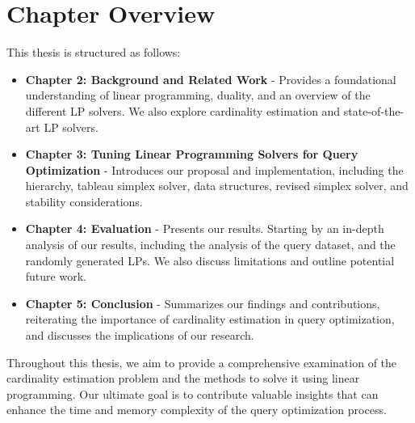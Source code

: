 \section{Chapter Overview}

This thesis is structured as follows:

\begin{itemize}
  \item \textbf{Chapter 2: Background and Related Work} - Provides a 
  foundational understanding of linear programming, duality, 
  and an overview of the different LP solvers. We also explore cardinality
   estimation and state-of-the-art LP solvers.
  \item \textbf{Chapter 3: Tuning Linear Programming Solvers for Query
   Optimization} - Introduces our proposal and implementation, 
   including the hierarchy, tableau simplex solver, data structures, 
   revised simplex solver, and stability considerations.
  \item \textbf{Chapter 4: Evaluation} - Presents our results. Starting by 
  an in-depth analysis 
  of our results, including the analysis of the query dataset, and the
   randomly generated LPs.
   We also discuss limitations and outline potential future work.
  \item \textbf{Chapter 5: Conclusion} - Summarizes our findings 
  and contributions, reiterating the importance of cardinality estimation 
  in query optimization, and discusses the implications of our research.
\end{itemize}

Throughout this thesis, we aim to provide a comprehensive 
examination of the cardinality estimation problem and the methods 
to solve it using linear programming. Our ultimate goal is to contribute 
valuable insights that can enhance the time and memory complexity of the 
query optimization process.

